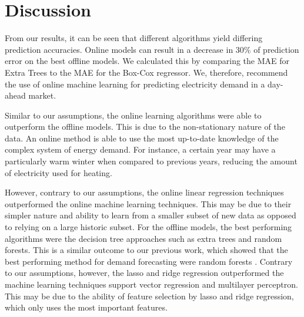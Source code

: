 \documentclass[final,3p,times,twocolumn,numbers]{elsarticle}
\begin{document}





\section{Discussion}
\label{sec:discussion}


From our results, it can be seen that different algorithms yield differing prediction accuracies. Online models can result in a decrease in 30\% of prediction error on the best offline models. We calculated this by comparing the MAE for Extra Trees to the MAE for the Box-Cox regressor. We, therefore, recommend the use of online machine learning for predicting electricity demand in a day-ahead market.

Similar to our assumptions, the online learning algorithms were able to outperform the offline models. This is due to the non-stationary nature of the data. An online method is able to use the most up-to-date knowledge of the complex system of energy demand. For instance, a certain year may have a particularly warm winter when compared to previous years, reducing the amount of electricity used for heating.

However, contrary to our assumptions, the online linear regression techniques outperformed the online machine learning techniques. This may be due to their simpler nature and ability to learn from a smaller subset of new data as opposed to relying on a large historic subset. For the offline models, the best performing algorithms were the decision tree approaches such as extra trees and random forests. This is a similar outcome to our previous work, which showed that the best performing method for demand forecasting were random forests \cite{Kell2018}. Contrary to our assumptions, however, the lasso and ridge regression outperformed the machine learning techniques support vector regression and multilayer perceptron. This may be due to the ability of feature selection by lasso and ridge regression, which only uses the most important features.
\end{document}

